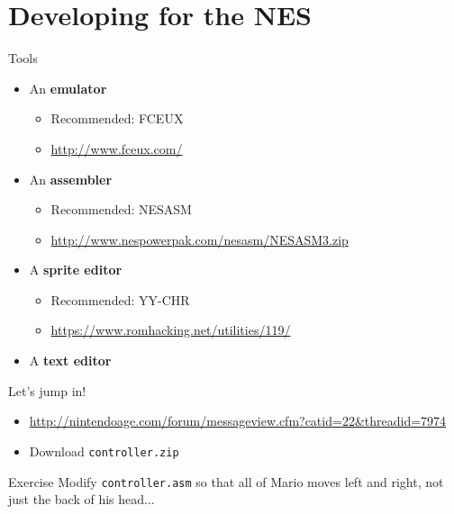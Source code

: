 \part{Developing for the NES}
\frame{\partpage}

\begin{frame}{Tools}
	\begin{itemize}
		\pause\item An \textbf{emulator}
			\begin{itemize}
				\pause\item Recommended: FCEUX
				\item \url{http://www.fceux.com/}
			\end{itemize}
		\pause\item An \textbf{assembler}
			\begin{itemize}
				\pause\item Recommended: NESASM
				\item {\footnotesize\url{http://www.nespowerpak.com/nesasm/NESASM3.zip}}
			\end{itemize}
		\pause\item A \textbf{sprite editor}
			\begin{itemize}
				\pause\item Recommended: YY-CHR
				\item \url{https://www.romhacking.net/utilities/119/}
			\end{itemize}
		\pause\item A \textbf{text editor}
	\end{itemize}
\end{frame}

\begin{frame}{Let's jump in!}
	\begin{itemize}
		\pause\item \url{http://nintendoage.com/forum/messageview.cfm?catid=22&threadid=7974}
		\pause\item Download \texttt{controller.zip}
	\end{itemize}
\end{frame}

\begin{frame}{Exercise}
	Modify \texttt{controller.asm} so that all of Mario moves left and right, not just the back of his head...
\end{frame}

